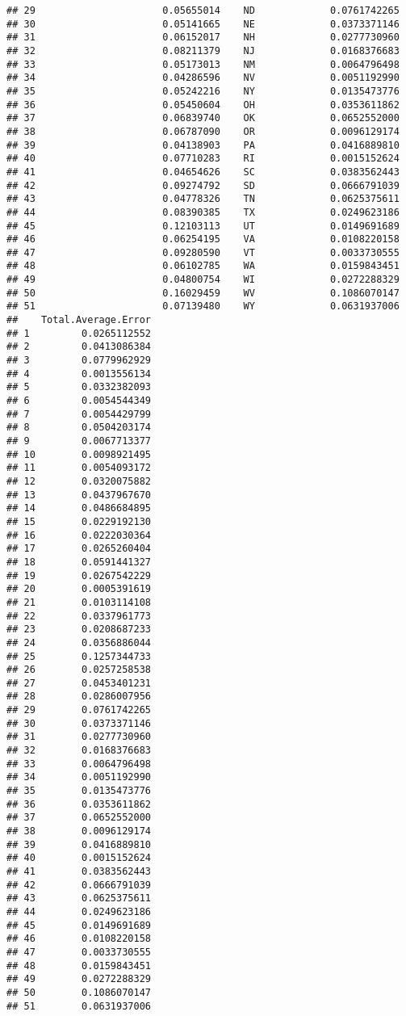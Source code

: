 \documentclass{article}\usepackage[]{graphicx}\usepackage[]{color}
\makeatletter
\newenvironment{kframe}{%
 \def\at@end@of@kframe{}%
 \ifinner\ifhmode%
  \def\at@end@of@kframe{\end{minipage}}%
  \begin{minipage}{\columnwidth}%
 \fi\fi%
 \def\FrameCommand##1{\hskip\@totalleftmargin \hskip-\fboxsep
 \colorbox{shadecolor}{##1}\hskip-\fboxsep
     \hskip-\linewidth \hskip-\@totalleftmargin \hskip\columnwidth}%
 \MakeFramed {\advance\hsize-\width
   \@totalleftmargin\z@ \linewidth\hsize
   \@setminipage}}%
 {\par\unskip\endMakeFramed%
 \at@end@of@kframe}
\newenvironment{knitrout}{}{} %
\makeatother
\begin{document}
\begin{knitrout}
\begin{kframe}
\begin{verbatim}
## 29                      0.05655014    ND             0.0761742265
## 30                      0.05141665    NE             0.0373371146
## 31                      0.06152017    NH             0.0277730960
## 32                      0.08211379    NJ             0.0168376683
## 33                      0.05173013    NM             0.0064796498
## 34                      0.04286596    NV             0.0051192990
## 35                      0.05242216    NY             0.0135473776
## 36                      0.05450604    OH             0.0353611862
## 37                      0.06839740    OK             0.0652552000
## 38                      0.06787090    OR             0.0096129174
## 39                      0.04138903    PA             0.0416889810
## 40                      0.07710283    RI             0.0015152624
## 41                      0.04654626    SC             0.0383562443
## 42                      0.09274792    SD             0.0666791039
## 43                      0.04778326    TN             0.0625375611
## 44                      0.08390385    TX             0.0249623186
## 45                      0.12103113    UT             0.0149691689
## 46                      0.06254195    VA             0.0108220158
## 47                      0.09280590    VT             0.0033730555
## 48                      0.06102785    WA             0.0159843451
## 49                      0.04800754    WI             0.0272288329
## 50                      0.16029459    WV             0.1086070147
## 51                      0.07139480    WY             0.0631937006
##    Total.Average.Error
## 1         0.0265112552
## 2         0.0413086384
## 3         0.0779962929
## 4         0.0013556134
## 5         0.0332382093
## 6         0.0054544349
## 7         0.0054429799
## 8         0.0504203174
## 9         0.0067713377
## 10        0.0098921495
## 11        0.0054093172
## 12        0.0320075882
## 13        0.0437967670
## 14        0.0486684895
## 15        0.0229192130
## 16        0.0222030364
## 17        0.0265260404
## 18        0.0591441327
## 19        0.0267542229
## 20        0.0005391619
## 21        0.0103114108
## 22        0.0337961773
## 23        0.0208687233
## 24        0.0356886044
## 25        0.1257344733
## 26        0.0257258538
## 27        0.0453401231
## 28        0.0286007956
## 29        0.0761742265
## 30        0.0373371146
## 31        0.0277730960
## 32        0.0168376683
## 33        0.0064796498
## 34        0.0051192990
## 35        0.0135473776
## 36        0.0353611862
## 37        0.0652552000
## 38        0.0096129174
## 39        0.0416889810
## 40        0.0015152624
## 41        0.0383562443
## 42        0.0666791039
## 43        0.0625375611
## 44        0.0249623186
## 45        0.0149691689
## 46        0.0108220158
## 47        0.0033730555
## 48        0.0159843451
## 49        0.0272288329
## 50        0.1086070147
## 51        0.0631937006
\end{verbatim}
\end{kframe}
\end{knitrout}
\end{document}
